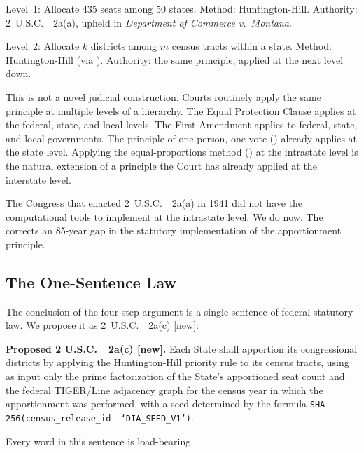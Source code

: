 Level~1: Allocate 435 seats among 50 states.
Method: Huntington-Hill.
Authority: 2~U.S.C.~\usca{}~2a(a), upheld in \textit{Department of Commerce
v.\ Montana}.

Level~2: Allocate $k$ districts among $m$ census tracts within a state.
Method: Huntington-Hill (via \ar{}).
Authority: the same principle, applied at the next level down.

This is not a novel judicial construction.
Courts routinely apply the same principle at multiple levels of a hierarchy.
The Equal Protection Clause applies at the federal, state, and local levels.
The First Amendment applies to federal, state, and local governments.
The principle of one person, one vote (\wesberry{}) already applies at the
state level.
Applying the equal-proportions method (\hh{}) at the intrastate level
is the natural extension of a principle the Court has already applied
at the interstate level.

The Congress that enacted 2~U.S.C.~\usca{}~2a(a) in 1941 did not have the
computational tools to implement \hh{} at the intrastate level.
We do now.
The \dia{} corrects an 85-year gap in the statutory implementation of the
apportionment principle.

\subsection{The One-Sentence Law}

The conclusion of the four-step argument is a single sentence of federal
statutory law.
We propose it as 2~U.S.C.~\usca{}~2a(c) [new]:

\begin{statute}
\noindent\textbf{Proposed 2 U.S.C.\ \usca{}\ 2a(c) [new].}
Each State shall apportion its congressional districts by applying the
Huntington-Hill priority rule to its census tracts, using as input only
the prime factorization of the State's apportioned seat count and the
federal TIGER/Line adjacency graph for the census year in which the
apportionment was performed, with a seed determined by the formula
\texttt{SHA-256(census\_release\_id \textbar\textbar\ `DIA\_SEED\_V1')}.
\end{statute}

Every word in this sentence is load-bearing.

